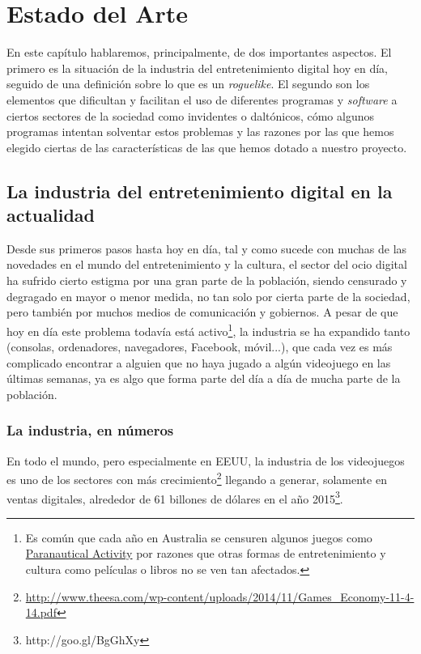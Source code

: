 \chapter{Estado del Arte}

En este capítulo hablaremos, principalmente, de dos importantes aspectos. El primero es la situación de la industria del entretenimiento digital hoy en día, seguido de una definición sobre lo que es un \textit{roguelike}. El segundo son los elementos que dificultan y facilitan el uso de diferentes programas y \textit{software} a ciertos sectores de la sociedad como invidentes o daltónicos, cómo algunos programas intentan solventar estos problemas y las razones por las que hemos elegido ciertas de las características de las que hemos dotado a nuestro proyecto.

\section{La industria del entretenimiento digital en la actualidad}

Desde sus primeros pasos hasta hoy en día, tal y como sucede con muchas de las novedades en el mundo del entretenimiento y la cultura, el sector del ocio digital ha sufrido cierto estigma por una gran parte de la población, siendo censurado y degragado en mayor o menor medida, no tan solo por cierta parte de la sociedad, pero también por muchos medios de comunicación y gobiernos. A pesar de que hoy en día este problema todavía está activo\footnote{Es común que cada año en Australia se censuren algunos juegos como \href{http://goo.gl/hFrQah}{Paranautical Activity} por razones que otras formas de entretenimiento y cultura como películas o libros no se ven tan afectados.}, la industria se ha expandido tanto (consolas, ordenadores, navegadores, Facebook, móvil...), que cada vez es más complicado encontrar a alguien que no haya jugado a algún videojuego en las últimas semanas, ya es algo que forma parte del día a día de mucha parte de la población.

\subsection{La industria, en números}
En todo el mundo, pero especialmente en EEUU, la industria de los videojuegos es uno de los sectores con más crecimiento\footnote{\url{http://www.theesa.com/wp-content/uploads/2014/11/Games_Economy-11-4-14.pdf}} llegando a generar, solamente en ventas digitales, alrededor de 61 billones de dólares en el año 2015\footnote{http://goo.gl/BgGhXy}.

